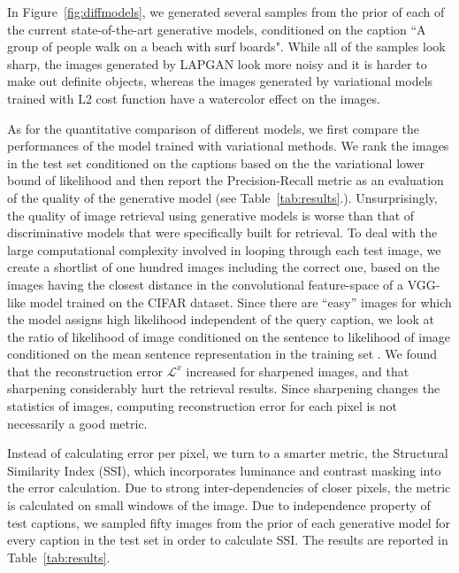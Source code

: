 \documentclass{article} %
\newcommand{\rloss}{\mathcal{L}^{x}}
\begin{document}
In Figure~\ref{fig:diffmodels}, we generated several samples from the prior of each of the current state-of-the-art generative models, conditioned on the caption ``A group of people walk on a beach with surf boards". While all of the samples look sharp, the images generated by LAPGAN look more noisy and it is harder to make out definite objects, whereas the images generated by variational models trained with L2 cost function have a watercolor effect on the images.

As for the quantitative comparison of different models, we first compare the performances of the model trained with variational methods. We rank the images in the test set conditioned on the captions based on the the variational lower bound of likelihood and then report the Precision-Recall metric as an evaluation of the quality of the generative model (see Table~\ref{tab:results}.). Unsurprisingly, the quality of image retrieval using generative models is worse than that of discriminative models that were specifically built for retrieval. To deal with the large computational complexity involved in looping through each test image, we create a shortlist of one hundred images including the correct one, based on the images having the closest distance in the convolutional feature-space of a VGG-like model trained on the CIFAR dataset. Since there are ``easy'' images for which the model assigns high likelihood independent of the query caption, we look at the ratio of likelihood of image conditioned on the sentence to likelihood of image conditioned on the mean sentence representation in the training set \cite{kiros_captions}. We found that the reconstruction error $\rloss$ increased for sharpened images, and that sharpening considerably hurt the retrieval results. Since sharpening changes the statistics of images, computing reconstruction error for each pixel is not necessarily a good metric.

Instead of calculating error per pixel, we turn to a smarter metric, the Structural Similarity Index (SSI), which incorporates luminance and contrast masking into the error calculation. Due to strong inter-dependencies of closer pixels, the metric is calculated on small windows of the image. Due to independence property of test captions, we sampled fifty images from the prior of each generative model for every caption in the test set in order to calculate SSI. The results are reported in Table~\ref{tab:results}.
\end{document}
